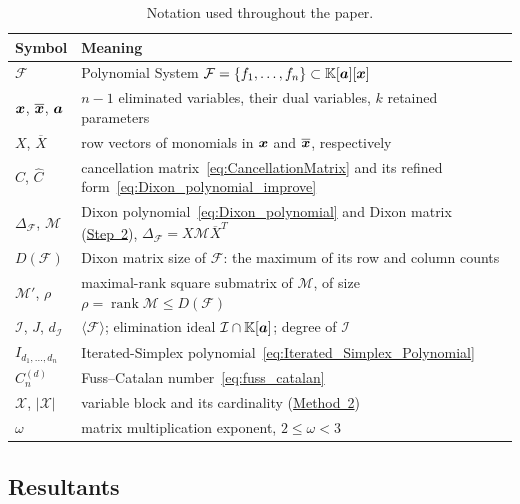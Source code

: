 \begin{table}[htbp]
	\centering
	\small
	\caption{Notation used throughout the paper.}
	\label{tab:notation}
	\setlength{\tabcolsep}{4pt}
	\renewcommand{\arraystretch}{1.05}
	\begin{tabular}{@{}l@{\quad}p{}@{}}
		\toprule
		\textbf{Symbol} & \textbf{Meaning} \\
		\midrule
        $\mathcal{F}$ & Polynomial System $\mathcal{F}=\{f_1, \dots, f_n\} \subset \mathbb{K}[{\boldsymbol{a}}][{\boldsymbol{x}}]$ \\
		${\boldsymbol{x}}$, $\overline{{\boldsymbol{x}}}$, ${\boldsymbol{a}}$ & $n-1$ eliminated variables, their dual variables, $k$ retained parameters \\
        $X$, $\overline X$ & row vectors of monomials in ${\boldsymbol{x}}$ and $\overline{{\boldsymbol{x}}}$, respectively \\
		$C$, $\widehat{C}$ & cancellation matrix~\eqref{eq:CancellationMatrix} and its refined form~\eqref{eq:Dixon_polynomial_improve} \\
		$\Delta_{\mathcal{F}}$, $\mathcal{M}$ & Dixon polynomial~\eqref{eq:Dixon_polynomial} and Dixon matrix (\hyperref[dixon_step2]{Step~2}), $\Delta_{\mathcal{F}}=X\mathcal{M}\overline{X}^{T}$ \\
		$D(\mathcal{F})$ & Dixon matrix size of $\mathcal{F}$: the maximum of its row and column counts \\
		$\mathcal{M}'$, $\rho$ & maximal-rank square submatrix of $\mathcal{M}$, of size $\rho=\operatorname{rank}\mathcal{M}\le D(\mathcal{F})$ \\
		$\mathcal{I}$, $J$, $d_{\mathcal{I}}$ & $\langle\mathcal{F}\rangle$; elimination ideal $\mathcal{I}\cap\mathbb{K}[{\boldsymbol{a}}]$; degree of $\mathcal{I}$ \\
		$I_{d_1,\ldots,d_n}$ & Iterated-Simplex polynomial~\eqref{eq:Iterated_Simplex_Polynomial} \\
        $C_n^{(d)}$ & Fuss--Catalan number~\eqref{eq:fuss_catalan} \\
        $\mathcal X$, $|\mathcal X|$ &
        variable block and its cardinality (\hyperref[subsec:method2]{Method~2}) \\
		$\omega$ & matrix multiplication exponent, $2\le\omega<3$ \\
		\bottomrule
	\end{tabular}
\end{table}

\subsection{Resultants}

